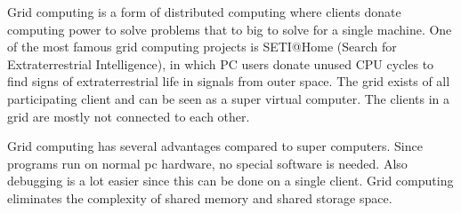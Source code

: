 	Grid computing is a form of distributed computing where clients donate computing power to solve problems that to big to solve for a single machine.
	One of the most famous grid computing projects is SETI@Home (Search for Extraterrestrial Intelligence), in which PC users donate unused CPU cycles to
	find signs of extraterrestrial life in signals from outer space. The grid exists of all participating client and can be seen as a super virtual computer.
	The clients in a grid are mostly not connected to each other. 
	
	Grid computing has several advantages compared to super computers. Since programs run on normal pc hardware, no special software is needed.
	Also debugging is a lot easier since this can be done on a single client. Grid computing eliminates the complexity of shared memory and shared storage space.
	
	